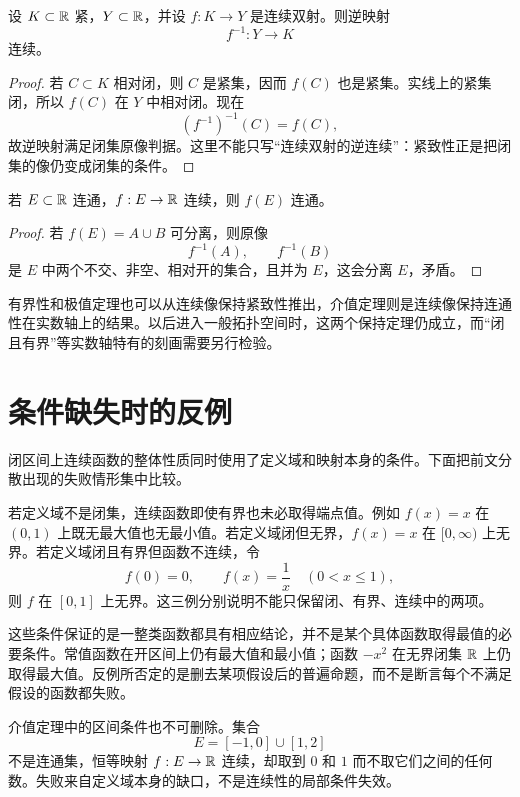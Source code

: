\begin{corollary}[紧集上的连续双射]
设 \(K\subset\mathbb{R}\) 紧，\(Y\subset\mathbb{R}\)，并设 \(f:K\to Y\) 是连续双射。则逆映射
\[
 f^{-1}:Y\to K
\]
连续。
\end{corollary}

\begin{proof}
若 \(C\subset K\) 相对闭，则 \(C\) 是紧集，因而 \(f(C)\) 也是紧集。实线上的紧集闭，所以 \(f(C)\) 在 \(Y\) 中相对闭。现在
\[
 (f^{-1})^{-1}(C)=f(C),
\]
故逆映射满足闭集原像判据。这里不能只写“连续双射的逆连续”：紧致性正是把闭集的像仍变成闭集的条件。
\end{proof}

\begin{theorem}[连续像保持连通性]
若 \(E\subset\mathbb{R}\) 连通，\(f:E\to\mathbb{R}\) 连续，则 \(f(E)\) 连通。
\end{theorem}

\begin{proof}
若 \(f(E)=A\cup B\) 可分离，则原像
\[
 f^{-1}(A),\qquad f^{-1}(B)
\]
是 \(E\) 中两个不交、非空、相对开的集合，且并为 \(E\)，这会分离 \(E\)，矛盾。
\end{proof}

有界性和极值定理也可以从连续像保持紧致性推出，介值定理则是连续像保持连通性在实数轴上的结果。以后进入一般拓扑空间时，这两个保持定理仍成立，而“闭且有界”等实数轴特有的刻画需要另行检验。

\section{条件缺失时的反例}

闭区间上连续函数的整体性质同时使用了定义域和映射本身的条件。下面把前文分散出现的失败情形集中比较。

若定义域不是闭集，连续函数即使有界也未必取得端点值。例如 \(f(x)=x\) 在 \((0,1)\) 上既无最大值也无最小值。若定义域闭但无界，\(f(x)=x\) 在 \([0,\infty)\) 上无界。若定义域闭且有界但函数不连续，令
\[
 f(0)=0,\qquad f(x)=\frac1x\quad(0<x\le1),
\]
则 \(f\) 在 \([0,1]\) 上无界。这三例分别说明不能只保留闭、有界、连续中的两项。

这些条件保证的是一整类函数都具有相应结论，并不是某个具体函数取得最值的必要条件。常值函数在开区间上仍有最大值和最小值；函数 \(-x^2\) 在无界闭集 \(\mathbb{R}\) 上仍取得最大值。反例所否定的是删去某项假设后的普遍命题，而不是断言每个不满足假设的函数都失败。

介值定理中的区间条件也不可删除。集合
\[
 E=[-1,0]\cup[1,2]
\]
不是连通集，恒等映射 \(f:E\to\mathbb{R}\) 连续，却取到 \(0\) 和 \(1\) 而不取它们之间的任何数。失败来自定义域本身的缺口，不是连续性的局部条件失效。

